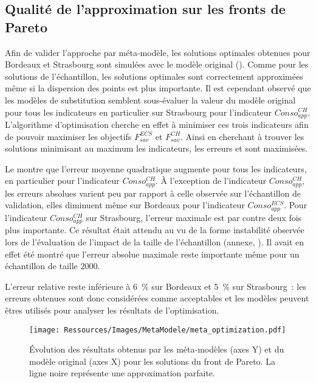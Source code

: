\subsection{Qualité de l’approximation sur les fronts de Pareto} %
\label{sub:qualite_de_l_approximation_sur_les_fronts_de_pareto}
Afin de valider l’approche par méta-modèle, les solutions optimales obtenues pour Bordeaux
et Strasbourg sont simulées avec le modèle original ().
Comme pour les solutions de l’échantillon, les solutions optimales sont correctement
approximées même si la dispersion des points est plus importante. Il est cependant
observé que les modèles de substitution semblent sous-évaluer la valeur du modèle
original pour tous les indicateurs en particulier sur Strasbourg pour l’indicateur
$Conso_{app}^{CH}$. L’algorithme d’optimisation cherche en effet à minimiser ces trois
indicateurs afin de pouvoir maximiser les objectifs $F_{sav}^{ECS}$ et $F_{sav}^{CH}$.
Ainsi en cherchant à trouver les solutions minimisant au maximum les indicateurs, les
erreurs  et  sont maximisées.

Le  montre que l’erreur moyenne quadratique augmente pour
tous les indicateurs, en particulier pour l’indicateur $Conso_{app}^{CH}$. À l’exception
de l’indicateur $Conso_{app}^{CH}$, les erreurs absolues varient peu par rapport à celle
observée sur l’échantillon de validation, elles diminuent même sur Bordeaux pour
l’indicateur $Conso_{app}^{ECS}$. Pour l’indicateur $Conso_{app}^{CH}$ sur Strasbourg,
l’erreur maximale est par contre deux fois plus importante. Ce résultat était attendu au
vu de la forme instabilité observée lors de l’évaluation de l’impact de la taille de
l’échantillon (annexe, ). Il avait en effet été montré que l’erreur
absolue maximale reste importante même pour un échantillon de taille $2000$.

L’erreur relative reste inférieure à \SI{6}{\percent} sur Bordeaux et
\SI{5}{\percent} sur Strasbourg~: les erreurs obtenues sont donc considérées
comme acceptables et les modèles peuvent êtres utilisés pour analyser les résultats de
l’optimisation.


\begin{figure}
    \centering
    \texttt{[image: Ressources/Images/MetaModele/meta\_optimization.pdf]}
    \caption[Évaluation de la précision des méta-modèles pour les solutions optimales]
            {Évolution des résultats obtenus par les méta-modèles (axes Y) et du modèle
             original (axes X) pour les solutions du front de Pareto.
             La ligne noire représente une approximation parfaite.}
    \label{fig:validite_meta_ssc_optimisation}
\end{figure}


